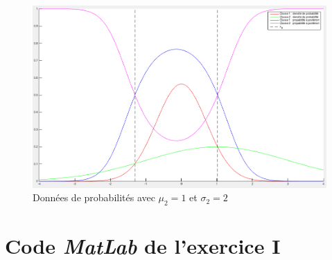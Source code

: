 \documentclass[11pt,a4paper]{article}
\begin{document}
\begin{figure}[H]
\center
\includegraphics[width=14cm]{exo1_graph_mu1_sigma2.png}
\caption{Données de probabilités avec $\mu_2 = 1$ et $\sigma_2 = 2$}
\end{figure}

\newpage
\section{Code \emph{MatLab} de l'exercice I}
\end{document}
